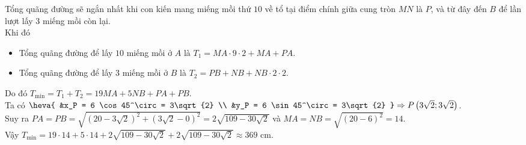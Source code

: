 \begin{ex}
{{
		} \noindent
		Tổng quãng đường sẽ ngắn nhất khi con kiến mang miếng mồi thứ $10$ về tổ tại điểm chính giữa cung tròn $MN$ là $P$, và từ đây đến $B$ để lần lượt lấy $3$ miếng mồi còn lại.\\
		Khi đó
		\begin{itemize}
			\item Tổng quãng đường để lấy $10$ miếng mồi ở $A$ là $T_1 = MA\cdot 9\cdot 2 + MA + PA$.
			\item Tổng quãng đường để lấy $3$ miếng mồi ở $B$ là $T_2 = PB + NB + NB\cdot 2\cdot 2$.
		\end{itemize}
		Do đó $T_{\min} = T_1 + T_2 = 19MA + 5NB + PA + PB$.\\
		Ta có
		$\heva{
			&x_P = 6 \cos 45^\circ = 3\sqrt{2} \\
			&y_P = 6 \sin 45^\circ = 3\sqrt{2}
		}\Rightarrow P\left( 3\sqrt{2}; 3\sqrt{2}\right) $.\\
		Suy ra $PA = PB = \sqrt{\left( 20 - 3\sqrt{2}\right)^2 + \left( 3\sqrt{2} - 0\right) ^2} = 2\sqrt{109 - 30\sqrt{2}}$ và $MA = NB = \sqrt{(20 - 6)^2} = 14$.\\
		Vậy $T_{\min} = 19\cdot 14 + 5\cdot 14 + 2\sqrt{109 - 30\sqrt{2}} + 2\sqrt{109 - 30\sqrt{2}} \approx 369$ cm.
	}
\end{ex}

